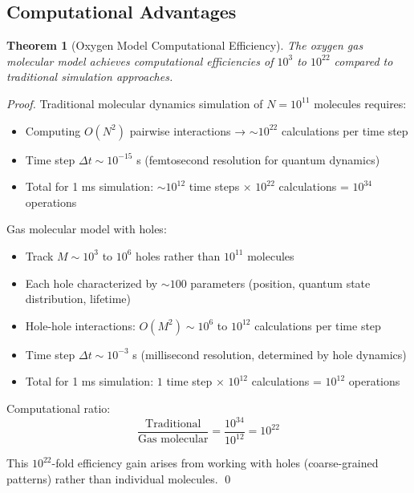 \documentclass[12pt,a4paper]{article}
\newtheorem{theorem}{Theorem}
\begin{document}
\subsection{Computational Advantages}

\begin{theorem}[Oxygen Model Computational Efficiency]
\label{thm:oxygen_efficiency}
The oxygen gas molecular model achieves computational efficiencies of $10^3$ to $10^{22}$ compared to traditional simulation approaches.
\end{theorem}

\begin{proof}
Traditional molecular dynamics simulation of $N = 10^{11}$  molecules requires:
\begin{itemize}
\item Computing $O(N^2)$ pairwise interactions → $\sim 10^{22}$ calculations per time step
\item Time step $\Delta t \sim 10^{-15}$ s (femtosecond resolution for quantum dynamics)
\item Total for 1 ms simulation: $\sim 10^{12}$ time steps × $10^{22}$ calculations = $10^{34}$ operations
\end{itemize}

Gas molecular model with holes:
\begin{itemize}
\item Track $M \sim 10^3$ to $10^6$ holes rather than $10^{11}$ molecules
\item Each hole characterized by $\sim 100$ parameters (position, quantum state distribution, lifetime)
\item Hole-hole interactions: $O(M^2) \sim 10^6$ to $10^{12}$ calculations per time step
\item Time step $\Delta t \sim 10^{-3}$ s (millisecond resolution, determined by hole dynamics)
\item Total for 1 ms simulation: $1$ time step × $10^{12}$ calculations = $10^{12}$ operations
\end{itemize}

Computational ratio:
\begin{equation}
\frac{\text{Traditional}}{\text{Gas molecular}} = \frac{10^{34}}{10^{12}} = 10^{22}
\end{equation}

This $10^{22}$-fold efficiency gain arises from working with holes (coarse-grained patterns) rather than individual molecules. \qed
\end{proof}
\end{document}
